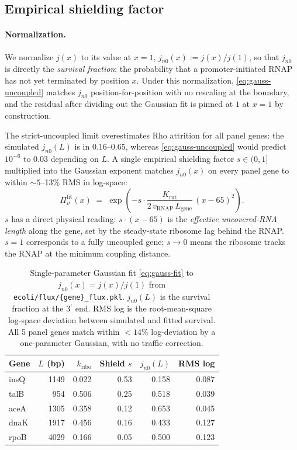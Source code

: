 \documentclass[11pt]{article}
\newcommand{\kribo}{k_{\text{ribo}}}
\begin{document}
\subsection{Empirical shielding factor}

\paragraph{Normalization.} We normalize $j(x)$ to its value at $x=1$,
$j_{n0}(x) := j(x)/j(1)$, so that $j_{n0}$ is directly the
\emph{survival fraction}: the probability that a promoter-initiated
RNAP has not yet terminated by position $x$. Under this normalization,
\eqref{eq:gauss-uncoupled} matches $j_{n0}$ position-for-position with
no rescaling at the boundary, and the residual after dividing out the
Gaussian fit is pinned at $1$ at $x=1$ by construction.

The strict-uncoupled limit overestimates Rho attrition for all panel
genes: the simulated $j_{n0}(L)$ is in $0.16$--$0.65$, whereas
\eqref{eq:gauss-uncoupled} would predict $10^{-6}$ to $0.03$ depending
on $L$. A single empirical shielding factor $s \in (0,1]$ multiplied
into the Gaussian exponent matches $j_{n0}(x)$ on every panel gene to
within $\sim 5$--13\% RMS in log-space:
\begin{equation}
  \Pi_\rho^{\text{fit}}(x) \;=\;
    \exp\!\left(-s \cdot \frac{K_{\text{rut}}}
                                  {2\, v_{\text{RNAP}}\, L_{\text{gene}}}
                       \,(x - 65)^2\right).
  \label{eq:gauss-fit}
\end{equation}
$s$ has a direct physical reading: $s \cdot (x - 65)$ is the
\emph{effective uncovered-RNA length} along the gene, set by the
steady-state ribosome lag behind the RNAP. $s = 1$ corresponds to a
fully uncoupled gene; $s \to 0$ means the ribosome tracks the RNAP at
the minimum coupling distance.

\begin{table}[h]
\centering
\small
\begin{tabular}{lrrrrr}
\toprule
Gene & $L$ (bp) & $\kribo$ & Shield $s$ & $j_{n0}(L)$ & RMS log \\
\midrule
insQ & 1149 & 0.022 & 0.53 & 0.158 & 0.087 \\
talB &  954 & 0.506 & 0.25 & 0.518 & 0.039 \\
aceA & 1305 & 0.358 & 0.12 & 0.653 & 0.045 \\
dnaK & 1917 & 0.456 & 0.16 & 0.433 & 0.127 \\
rpoB & 4029 & 0.166 & 0.05 & 0.500 & 0.123 \\
\bottomrule
\end{tabular}
\caption{Single-parameter Gaussian fit \eqref{eq:gauss-fit} to
$j_{n0}(x) = j(x)/j(1)$ from \texttt{ecoli/flux/\{gene\}\_flux.pkl}.
$j_{n0}(L)$ is the survival fraction at the 3$^\prime$ end. RMS log is
the root-mean-square log-space deviation between simulated and fitted
survival. All 5 panel genes match within $<14\%$ log-deviation by a
one-parameter Gaussian, with no traffic correction.}
\label{tab:shield}
\end{table}
\end{document}
